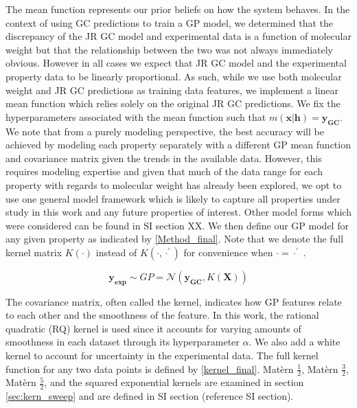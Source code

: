 \documentclass[journal=jacsat,manuscript=article]{achemso}
\begin{document}
 

The mean function represents our prior beliefs on how the system behaves. In the context of using GC predictions to train a GP model, we determined that the discrepancy of the JR GC model and experimental data is a function of molecular weight but that the relationship between the two was not always immediately obvious. However in all cases we expect that JR GC model and the experimental property data to be linearly proportional. As such, while we use both molecular weight and JR GC predictions as training data features, we implement a linear mean function which relies solely on the original JR GC predictions. We fix the hyperparameters associated with the mean function such that $m(\mathbf{x}\vert \mathbf{h}) = \mathbf{y_{GC}}$. We note that from a purely modeling perspective, the best accuracy will be achieved by modeling each property separately with a different GP mean function and covariance matrix given the trends in the available data. However, this requires modeling expertise and given that much of the data range for each property with regards to molecular weight has already been explored, we opt to use one general model framework which is likely to capture all properties under study in this work and any future properties of interest. Other model forms which were considered can be found in SI section XX. We then define our GP model for any given property as indicated by \eqref{Method_final}. Note that we denote the full kernel matrix $K(\cdot)$ instead of $K(\cdot, \cdot^{\prime})$ for convenience when $\cdot = \cdot^{\prime}$ .

\begin{equation}
    \mathbf{y_{\text{exp}}} \sim GP = \mathcal{N}\left( \mathbf{y_{GC}}, K(\mathbf{X}) \right)
    \label{Method_final}
\end{equation}

The covariance matrix, often called the kernel, indicates how GP features relate to each other and the smoothness of the feature. In this work, the rational quadratic (RQ) kernel is used since it accounts for varying amounts of smoothness in each dataset through its hyperparameter $\alpha$. We also add a white kernel to account for uncertainty in the experimental data. The full kernel function for any two data points is defined by \eqref{kernel_final}. Mat\`ern $\frac{1}{2}$, Mat\`ern $\frac{3}{2}$, Mat\`ern $\frac{5}{2}$, and the squared exponential kernels are examined in section \ref{sec:kern_sweep} and are defined in SI section (reference SI section).
\end{document}
